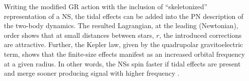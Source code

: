 Writing the modified \ac{GR} action with the inclusion of ``skeletonized'' representation
of a \ac{NS}, the tidal effects can be added into the \ac{PN} description of the two-body dynamics.
The resulted Lagrangian, at the leading (Newtonian), order shows that at small distances 
between stars, $r$, the introduced corrections are attractive. 
%
Further, the Kepler law, given by the quadrupolar gravitoelectric term, 
%
%
shows that the finite-size effects manifest as an increased orbital frequency at a given radius.
In other words, the \acp{NS} spin faster if tidal effects are present and merge sooner 
producing signal with higher frequency \citep{Damour:2009wj}. 
%

